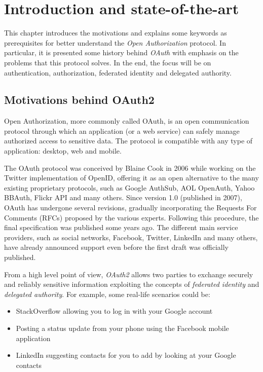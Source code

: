 \chapter{Introduction and state-of-the-art}
\minitoc

This chapter introduces the motivations and explains some keywords as prerequisites for better understand the \textit{Open Authorization} protocol. In particular, it is presented some history behind \textit{OAuth} with emphasis on the problems that this protocol solves. In the end, the focus will be on authentication, authorization, federated identity and delegated authority.

\section{Motivations behind OAuth2}
Open Authorization, more commonly called OAuth, is an open communication protocol through which an application (or a web service) can safely manage authorized access to sensitive data. The protocol is compatible with any type of application: desktop, web and mobile.

The OAuth protocol was conceived by Blaine Cook in 2006 while working on the Twitter implementation of OpenID, offering it as an open alternative to the many existing proprietary protocols, such as Google AuthSub, AOL OpenAuth, Yahoo BBAuth, Flickr API and many others. Since version 1.0 (published in 2007), OAuth has undergone several revisions, gradually incorporating the Requests For Comments (RFCs) proposed by the various experts. Following this procedure, the final specification was published some years ago. The different main service providers, such as social networks, Facebook, Twitter, LinkedIn and many others, have already announced support even before the first draft was officially published.

From a high level point of view, \textit{OAuth2} allows two parties to exchange securely and reliably sensitive information exploiting the concepts of \textit{federated identity} and \textit{delegated authority}. For example, some real-life scenarios could be:

\begin{itemize}
    \item StackOverflow allowing you to log in with your Google account
    \item Posting a status update from your phone using the Facebook mobile application
    \item LinkedIn suggesting contacts for you to add by looking at your Google contacts
\end{itemize}

